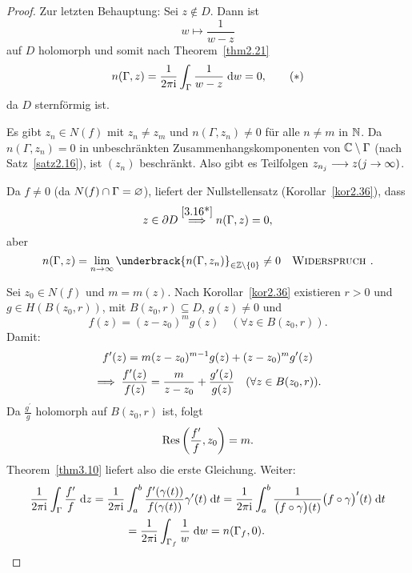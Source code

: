 \documentclass[a4paper,twoside,DIV15,BCOR12mm]{scrbook}
\begin{document}
\begin{proof}
Zur letzten Behauptung: Sei $z\notin D$. Dann ist 
\[w\mapsto\frac{1}{w-z}\]
auf $D$ holomorph und somit nach Theorem~\ref{thm2.21}
\[\label{3.16*}n(\Gamma,z) = \frac{1}{2\pi\mathrm{i}}\int_{\Gamma}^{}{\frac{1}{w-z}}\;\mathrm{d} w = 0,\tag{$*$}\]
da $D$ sternförmig ist.

\ann Es gibt $z_n\in N(f)$ mit $z_n\neq z_m$ und $n(\Gamma,z_n)\neq 0$ für alle $n\neq m$ in $\mathbb{N}$. Da $n(\Gamma,z_n) = 0$ in unbeschränkten Zusammenhangskomponenten von $\mathbb{C}\setminus\Gamma$ (nach Satz~\ref{satz2.16}), ist $(z_n)$ beschränkt. Also gibt es Teilfolgen $z_{n_j}\longrightarrow z(j\to\infty)$.

Da $f\neq 0$ (da $N(f)\cap\Gamma = \varnothing$), liefert der Nullstellensatz (Korollar~\ref{kor2.36}), dass
\[z\in\partial D \overset{\eqref{3.16*}}{\implies} n(\Gamma,z) = 0,\]
aber
\[n(\Gamma,z) = \lim_{n\to\infty} \underbrack{n(\Gamma,z_n)}_{\in\Z\setminus\{0\}} \neq 0\quad\text{\ws}.\]

Sei $z_0\in N(f)$ und $m=m(z)$. Nach Korollar~\ref{kor2.36} existieren $r>0$ und $g\in H(B(z_0,r))$, mit $B(z_0,r)\subseteq D$, $g(z)\neq 0$ und 
\[f(z) = (z-z_0)^mg(z)\quad(\forall z\in B(z_0,r)).\]
Damit:
\begin{gather*}
f^\prime(z) = m(z-z_0)^{m-1}g(z)+(z-z_0)^mg^\prime(z)\\
\implies\frac{f^\prime(z)}{f(z)} = \frac{m}{z-z_0} + \frac{g^\prime(z)}{g(z)}\quad(\forall z\in B(z_0,r)).
\end{gather*}
Da $\frac{g^\prime}{g}$ holomorph auf $B(z_0,r)$ ist, folgt
\[\mathrm{Res}\left(\frac{f^\prime}{f},z_0\right) = m.\]
Theorem~\ref{thm3.10} liefert also die erste Gleichung. Weiter:
\begin{gather*}
\frac{1}{2\pi\mathrm{i}}\int_{\Gamma}^{}{\frac{f^\prime}{f}}\;\mathrm{d} z = \frac{1}{2\pi\mathrm{i}}\int_{a}^{b}{\frac{f^\prime(\gamma(t))}{f(\gamma(t))}\gamma^\prime(t)}\;\mathrm{d} t = \frac{1}{2\pi\mathrm{i}}\int_{a}^{b}{\frac{1}{\bigl(f\circ\gamma\bigr)(t)}\bigl(f\circ\gamma\bigr)^\prime(t)}\;\mathrm{d} t\\
 = \frac{1}{2\pi\mathrm{i}}\int_{\Gamma_f}^{}{\frac{1}{w}}\;\mathrm{d} w = n(\Gamma_f,0).\tag*{\qedhere}\end{gather*}
\end{proof}
\end{document}
